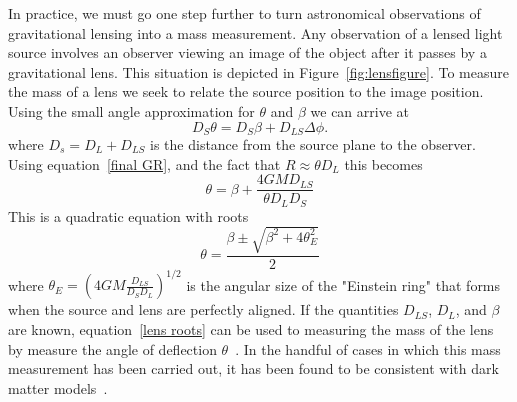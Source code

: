 In practice, we must go one step further to turn astronomical observations of gravitational lensing into a mass measurement.  Any observation of a lensed light source involves an observer viewing an image of the object after it passes by a gravitational lens.  This situation is depicted in Figure~\ref{fig:lensfigure}. To measure the mass of a lens we seek to relate the source position to the image position. Using the small angle approximation for $\theta$ and $\beta$ we can arrive at
\begin{equation} \label{lens eq 1}
D_S \theta = D_S\beta + D_{LS} \Delta \phi.
\end{equation}
where $D_s=D_L+D_{LS}$ is the distance from the source plane to the observer.  Using equation~\ref{final GR}, and the fact that $R \approx \theta D_L$ this becomes
\begin{equation} \label{lens eq 2}
\theta = \beta + \frac{4GM D_{LS}}{\theta D_L D_S}
\end{equation}
This is a quadratic equation with roots
\begin{equation} \label{lens roots}
\theta = \frac{ \beta \pm \sqrt{ \beta^2 + 4 \theta^2_E}}{2}
\end{equation}
where $\theta_E = \left(4GM \frac{D_{LS}}{D_S D_L} \right)^{1/2}$ is the angular size of the "Einstein ring" that forms when the source and lens are perfectly aligned.  If the quantities $D_{LS}$, $D_L$, and $\beta$ are known, equation~\ref{lens roots} can be used to measuring the mass of the lens by measure the angle of deflection $\theta$~\cite{Bin-Nun}. In the handful of cases in which this mass measurement has been carried out, it has been found to be consistent with dark matter models~\cite{Wu}. %


